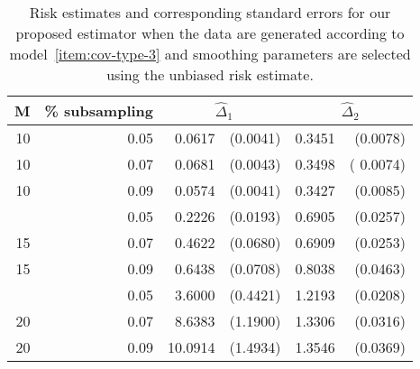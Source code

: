 \documentclass[12pt]{article}
\theoremstyle{definition}
\begin{document}
\begin{table}[H] \label{table:simulation-2-sigma-3}
\centering
\begin{tabular}{rrrrrr}
M & \% subsampling &  \multicolumn{2}{c}{$\hat{\Delta}_1$}  &  \multicolumn{2}{c}{$\hat{\Delta}_2$} \\  
  \hline
10 & 0.05 & 0.0617 & (0.0041) & 0.3451 & (0.0078) \\ 
  10 & 0.07 & 0.0681 & (0.0043) & 0.3498 &( 0.0074) \\ 
  10 & 0.09 & 0.0574 & (0.0041) & 0.3427 & (0.0085) \\ 
    \hdashline
  15 & 0.05 & 0.2226 & (0.0193) & 0.6905 & (0.0257) \\ 
  15 & 0.07 & 0.4622 & (0.0680) & 0.6909 & (0.0253) \\ 
  15 & 0.09 & 0.6438 & (0.0708) & 0.8038 & (0.0463) \\ 
    \hdashline
  20 & 0.05 & 3.6000 & (0.4421) & 1.2193 & (0.0208) \\ 
  20 & 0.07 & 8.6383 & (1.1900) & 1.3306 & (0.0316) \\ 
  20 & 0.09 & 10.0914 & (1.4934) & 1.3546 & (0.0369) \\ 
   \hline
\end{tabular}
\caption{Risk estimates and corresponding standard errors for our proposed estimator when the data are generated according to model~\ref{item:cov-type-3}  and smoothing parameters are selected using the unbiased risk estimate.} 
\end{table}

\end{document}
